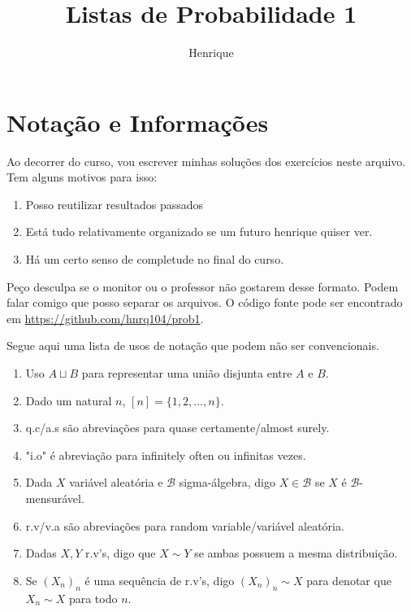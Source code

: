 \documentclass[11pt]{article}
\author{
	Henrique
}
\title{Listas de Probabilidade 1}
\theoremstyle{definition}
\begin{document}
\maketitle

\tableofcontents
\setcounter{section}{-1}
\section{Notação e Informações}

Ao decorrer do curso, vou escrever minhas soluções dos exercícios
neste arquivo. Tem alguns motivos para isso:
\begin{enumerate}[label=(\roman*)]
	\item Posso reutilizar resultados passados
	\item Está tudo relativamente organizado se um futuro henrique quiser ver.
	\item Há um certo senso de completude no final do curso.
\end{enumerate}
Peço desculpa se o monitor ou o professor não gostarem desse formato.
Podem falar comigo que posso separar os arquivos.
O código fonte pode ser encontrado em \url{https://github.com/hnrq104/prob1}.

Segue aqui uma lista de usos de notação que podem não ser convencionais.
\begin{enumerate}
	\item Uso $A \sqcup B$ para representar uma união disjunta entre $A$ e $B$.
	\item Dado um natural $n$, $[n] = \{1, 2, \dots, n\}$.
	\item q.c/a.s são abreviações para quase certamente/almost surely.
	\item "i.o" é abreviação para infinitely often ou infinitas vezes.
	\item Dada $X$ variável aleatória e $\mathcal{B}$ sigma-álgebra,
		digo $X \in \mathcal{B}$ se $X$ é $\mathcal{B}$-mensurável.
	\item r.v/v.a são abreviações para random variable/variável aleatória.
	\item Dadas $X,Y$ r.v's, digo que $X \sim Y$ se ambas possuem a
		mesma distribuição.
	\item Se $(X_n)_n$ é uma sequência de r.v's, digo $(X_n)_n \sim X$
		para denotar que $X_n \sim X$ para todo $n$.
\end{enumerate}





% 
\end{document}
